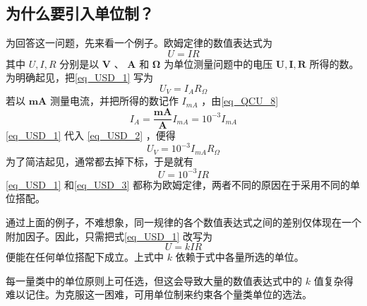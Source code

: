 


\subsection{为什么要引入单位制？}
为回答这一问题，先来看一个例子。欧姆定律的数值表达式为
\begin{equation}\label{eq_USD_1}
U=IR
\end{equation}
其中 $U,I,R$ 分别是以 \textbf{$\boldsymbol{V}$ }、\textbf{ $\boldsymbol{A}$ }和\textbf{ $\boldsymbol{\Omega}$ }为单位测量问题中的电压 $\boldsymbol{U},\boldsymbol{I},\boldsymbol{R}$ 所得的数。为明确起见，把\autoref{eq_USD_1} 写为
\begin{equation}
U_{V}=I_{A}R_{\Omega}
\end{equation}
若以 \textbf{$\boldsymbol{mA}$} 测量电流，并把所得的数记作 $I_{mA}$ ，由\autoref{eq_QCU_8}~ 
\begin{equation}\label{eq_USD_2}
I_{A}=\frac{\boldsymbol{mA}}{\boldsymbol{A}}I_{mA}=10^{-3}I_{mA}
\end{equation}
\autoref{eq_USD_1} 代入 \autoref{eq_USD_2} ，便得
\begin{equation}
U_{V}=10^{-3}I_{mA}R_{\Omega}
\end{equation}
为了简洁起见，通常都去掉下标，于是就有
\begin{equation}\label{eq_USD_3}
U=10^{-3}IR
\end{equation}
\autoref{eq_USD_1} 和\autoref{eq_USD_3} 都称为欧姆定律，两者不同的原因在于采用不同的单位搭配。

通过上面的例子，不难想象，同一规律的各个数值表达式之间的差别仅体现在一个附加因子。因此，只需把式\autoref{eq_USD_1} 改写为
\begin{equation}\label{eq_USD_10}
U=kIR
\end{equation}
便能在任何单位搭配下成立。上式中 $k$ 依赖于式中各量所选的单位。

每一量类中的单位原则上可任选，但这会导致大量的数值表达式中的 $k$ 值复杂得难以记住。为克服这一困难，可用单位制来约束各个量类单位的选法。
